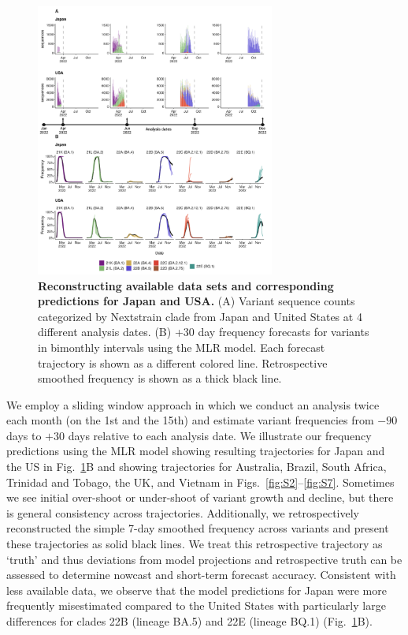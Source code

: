 \begin{figure}[tb!]
	\centering
	\includegraphics[width=0.70\textwidth]{figures/dynamic_est_env.png}
	\caption{
		\textbf{Reconstructing available data sets and corresponding predictions for Japan and USA.}
		(A) Variant sequence counts categorized by Nextstrain clade from Japan and United States at 4 different analysis dates.
		(B) +30 day frequency forecasts for variants in bimonthly intervals using the MLR model.
		Each forecast trajectory is shown as a different colored line.
		Retrospective smoothed frequency is shown as a thick black line.
	}
	\label{fig:Fig1}
\end{figure}

We employ a sliding window approach in which we conduct an analysis twice each month (on the 1st and the 15th) and estimate variant frequencies from $-90$ days to $+30$ days relative to each analysis date.
We illustrate our frequency predictions using the MLR model showing resulting trajectories for Japan and the US in Fig.~\ref{fig:Fig1}B and showing trajectories for Australia, Brazil, South Africa, Trinidad and Tobago, the UK, and Vietnam in Figs.~\ref{fig:S2}--\ref{fig:S7}.
Sometimes we see initial over-shoot or under-shoot of variant growth and decline, but there is general consistency across trajectories.
Additionally, we retrospectively reconstructed the simple 7-day smoothed frequency across variants and present these trajectories as solid black lines.
We treat this retrospective trajectory as `truth' and thus deviations from model projections and retrospective truth can be assessed to determine nowcast and short-term forecast accuracy.
Consistent with less available data, we observe that the model predictions for Japan were more frequently misestimated compared to the United States with particularly large differences for clades 22B (lineage BA.5) and 22E (lineage BQ.1) (Fig.~\ref{fig:Fig1}B).



